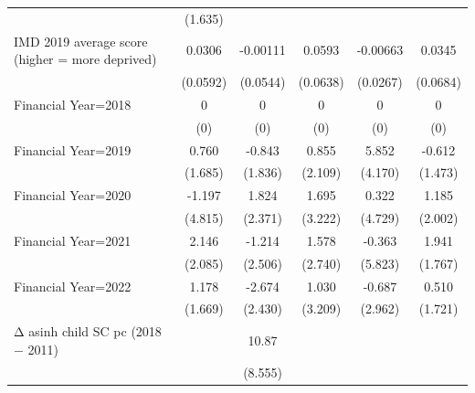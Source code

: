 \begin{table}[htbp]
\begin{tabular}{l*{5}{c}}
                    &     (1.635)         &                     &                     &                     &                     \\
\addlinespace
IMD 2019 average score (higher = more deprived)&      0.0306         &    -0.00111         &      0.0593         &    -0.00663         &      0.0345         \\
                    &    (0.0592)         &    (0.0544)         &    (0.0638)         &    (0.0267)         &    (0.0684)         \\
\addlinespace
Financial Year=2018 &           0         &           0         &           0         &           0         &           0         \\
                    &         (0)         &         (0)         &         (0)         &         (0)         &         (0)         \\
\addlinespace
Financial Year=2019 &       0.760         &      -0.843         &       0.855         &       5.852         &      -0.612         \\
                    &     (1.685)         &     (1.836)         &     (2.109)         &     (4.170)         &     (1.473)         \\
\addlinespace
Financial Year=2020 &      -1.197         &       1.824         &       1.695         &       0.322         &       1.185         \\
                    &     (4.815)         &     (2.371)         &     (3.222)         &     (4.729)         &     (2.002)         \\
\addlinespace
Financial Year=2021 &       2.146         &      -1.214         &       1.578         &      -0.363         &       1.941         \\
                    &     (2.085)         &     (2.506)         &     (2.740)         &     (5.823)         &     (1.767)         \\
\addlinespace
Financial Year=2022 &       1.178         &      -2.674         &       1.030         &      -0.687         &       0.510         \\
                    &     (1.669)         &     (2.430)         &     (3.209)         &     (2.962)         &     (1.721)         \\
\addlinespace
Δ asinh child SC pc (2018 − 2011)&                     &       10.87         &                     &                     &                     \\
                    &                     &     (8.555)         &                     &                     &                     \\

\end{tabular}
\end{table}
